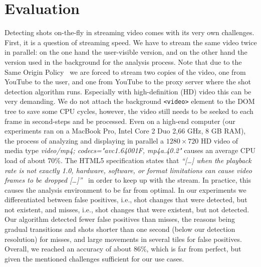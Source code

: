 \documentclass{acm_proc_article-sp}
\begin{document}

\section{Evaluation} \label{sec:evaluation}
Detecting shots on-the-fly in streaming video comes with its very own challenges. First, it is a question of streaming speed. We have to stream the same video twice in parallel: on the one hand the user-visible version, and on the other hand the version used in the background for the analysis process. Note that due to the Same Origin Policy~\cite{sameoriginpolicy} we are forced to stream two copies of the video, one from YouTube to the user, and one from YouTube to the proxy server where the shot detection algorithm runs. Especially with high-definition (HD) video this can be very demanding. We do not attach the background \texttt{<video>} element to the DOM tree to save some CPU cycles, however, the video still needs to be seeked to each frame in second-steps and be processed. Even on a high-end computer (our experiments ran on a MacBook Pro, Intel Core 2 Duo 2,66 GHz, 8 GB RAM), the process of analyzing and displaying in parallel a $\mathit{1280} \times \mathit{720}$ HD video of media type \emph{video/mp4; codecs="avc1.64001F, mp4a.40.2"} causes an average CPU load of about 70\%. The HTML5 specification states that \textit{``[\ldots] when the playback rate is not exactly 1.0, hardware, software, or format limitations can cause video frames to be dropped [\ldots]''}~\cite{whatwgvideo} in order to keep up with the stream. In practice, this causes the analysis environment to be far from optimal. In our experiments we differentiated between false positives, i.e., shot changes that were detected, but not existent, and misses, i.e., shot changes that were existent, but not detected. Our algorithm detected fewer false positives than misses, the reasons being gradual transitions and shots shorter than one second (below our detection resolution) for misses, and large movements in several tiles for false positives. Overall, we reached an accuracy of about 86\%, which is far from perfect, but given the mentioned challenges sufficient for our use cases. 
\end{document}
